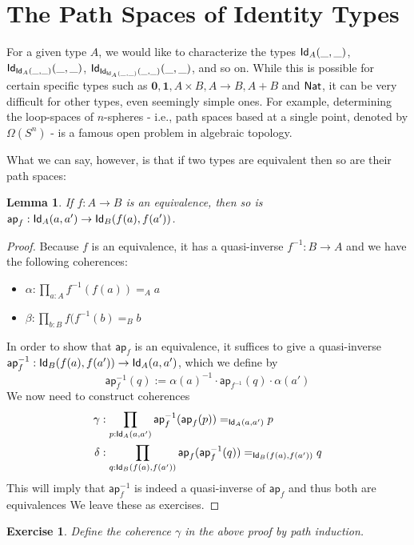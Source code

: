 \documentclass[12pt]{article}
\newcommand{\ap}{\mathsf{ap}}
\newtheorem*{exercise}{Exercise}
\newtheorem*{lemma}{Lemma}
\begin{document}
\section{The Path Spaces of Identity Types}\label{}

For a given type $A$, we would like to characterize the types $\mathsf{Id}_{A}(\_,\_)$,
$\mathsf{Id}_{\mathsf{Id}_{A}(\_,\_)}(\_,\_)$, $\mathsf{Id}_{\mathsf{Id}_{\mathsf{Id}_{A}(\_,\_)}(\_,\_)}(\_,\_)$, and so on. While this is possible for certain specific types such as $\mathbf{0}, \mathbf{1}, A \times B, A \to B, A + B$ and $\mathsf{Nat}$, it can be very difficult for other types, even seemingly simple ones. For example, determining the loop-spaces of $n$-spheres - i.e., path spaces based at a single point, denoted by $\Omega(S^n)$ - is a famous open problem in algebraic topology.

What we can say, however, is that if two types are equivalent then so are their path spaces:

\begin{lemma} If $f : A \to B$ is an equivalence, then so is \
$\ap_f:\Id{A}(a,a')\to\Id{B}(f(a),f(a'))$.
\end{lemma}

\begin{proof}
Because $f$ is an equivalence, it has a quasi-inverse $f^{-1}:B\to A$ and we have the following coherences:

\begin{itemize}
\item $\alpha:\prod_{a:A} f^{-1}(f(a)) =_A a$
\item $\beta:\prod_{b:B} f(f^{-1}(b) =_B b$
\end{itemize}

In order to show that $\ap_f$ is an equivalence, it suffices to give a
quasi-inverse $\ap_f^{-1}:\Id{B}(f(a),f(a'))\to\Id{A}(a,a')$, which we define by
\[
\ap_f^{-1}(q) := \alpha(a)^{-1} \cdot \ap_{f^{-1}}(q) \cdot \alpha(a')
\]
We now need to construct coherences
\begin{align*}
\gamma&:\prod_{p:\Id{A}(a,a')}\ap_f^{-1}(\ap_f(p)) =_{\Id{A}(a,a')} p \\
\delta&:\prod_{q:\Id{B}(f(a),f(a'))}\ap_f(\ap_f^{-1}(q)) =_{\Id{B}(f(a),f(a'))} q
\end{align*}
This will imply that $\ap_f^{-1}$ is indeed a quasi-inverse of $\ap_f$ and thus both are equivalences We leave these as exercises.
\end{proof}

\begin{exercise} Define the coherence $\gamma$ in the above proof by path induction.
\end{exercise}
\end{document}
